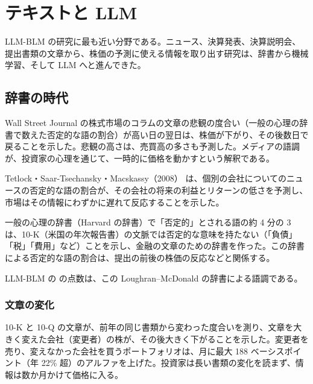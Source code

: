 \chapter{テキストと LLM}
\label{ch:text}

LLM-BLM の研究に最も近い分野である。ニュース、決算発表、決算説明会、提出書類の文章から、株価の予測に使える情報を取り出す研究は、辞書から機械学習、そして LLM へと進んできた。

\section{辞書の時代}

\begin{paperbox}
Wall Street Journal の株式市場のコラムの文章の悲観の度合い（一般の心理の辞書で数えた否定的な語の割合）が高い日の翌日は、株価が下がり、その後数日で戻ることを示した。悲観の高さは、売買高の多さも予測した。メディアの語調が、投資家の心理を通じて、一時的に価格を動かすという解釈である。
\end{paperbox}

Tetlock・Saar-Tsechansky・Macskassy（2008）\cite{tsm2008} は、個別の会社についてのニュースの否定的な語の割合が、その会社の将来の利益とリターンの低さを予測し、市場はその情報にわずかに遅れて反応することを示した。

\begin{paperbox}
一般の心理の辞書（Harvard の辞書）で「否定的」とされる語の約 4 分の 3 は、10-K（米国の年次報告書）の文脈では否定的な意味を持たない（「負債」「税」「費用」など）ことを示し、金融の文章のための辞書を作った。この辞書による否定的な語の割合は、提出の前後の株価の反応などと関係する。
\end{paperbox}

LLM-BLM の  の点数は、この Loughran--McDonald の辞書による語調である。

\subsection{文章の変化}

\begin{paperbox}
10-K と 10-Q の文章が、前年の同じ書類から変わった度合いを測り、文章を大きく変えた会社（変更者）の株が、その後大きく下がることを示した。変更者を売り、変えなかった会社を買うポートフォリオは、月に最大 188 ベーシスポイント（年 22\% 超）のアルファを上げた。投資家は長い書類の変化を読まず、情報は数か月かけて価格に入る。
\end{paperbox}


